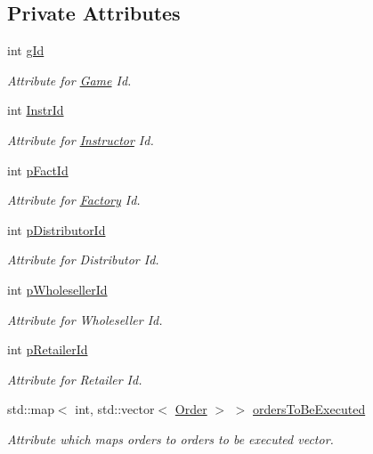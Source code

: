 \subsection*{Private Attributes}
\begin{DoxyCompactItemize}
\item 
int \hyperlink{class_game_a448cd197d12e3051ca3946906917eb97}{g\+Id}
\begin{DoxyCompactList}\small\item\em Attribute for \hyperlink{class_game}{Game} Id. \end{DoxyCompactList}\item 
int \hyperlink{class_game_ad12306e232a5ed72de6435c77383cfe2}{Instr\+Id}
\begin{DoxyCompactList}\small\item\em Attribute for \hyperlink{class_instructor}{Instructor} Id. \end{DoxyCompactList}\item 
int \hyperlink{class_game_ac516a7154e48c4ca10b40da5c1a1ab6d}{p\+Fact\+Id}
\begin{DoxyCompactList}\small\item\em Attribute for \hyperlink{class_factory}{Factory} Id. \end{DoxyCompactList}\item 
int \hyperlink{class_game_a3a1c85c5fdd16e9b99ba4c45ae2c6368}{p\+Distributor\+Id}
\begin{DoxyCompactList}\small\item\em Attribute for Distributor Id. \end{DoxyCompactList}\item 
int \hyperlink{class_game_a3d318d2ddeeba939359c1c3bdf17e0eb}{p\+Wholeseller\+Id}
\begin{DoxyCompactList}\small\item\em Attribute for Wholeseller Id. \end{DoxyCompactList}\item 
int \hyperlink{class_game_aad086ef718ee39a0b0f72fbfafb5e30c}{p\+Retailer\+Id}
\begin{DoxyCompactList}\small\item\em Attribute for Retailer Id. \end{DoxyCompactList}\item 
std\+::map$<$ int, std\+::vector$<$ \hyperlink{class_order}{Order} $>$ $>$ \hyperlink{class_game_ae48a7dd1eb19120b78b70d3814d207fc}{orders\+To\+Be\+Executed}
\begin{DoxyCompactList}\small\item\em Attribute which maps orders to orders to be executed vector. \end{DoxyCompactList}\item 

\end{DoxyCompactItemize}
